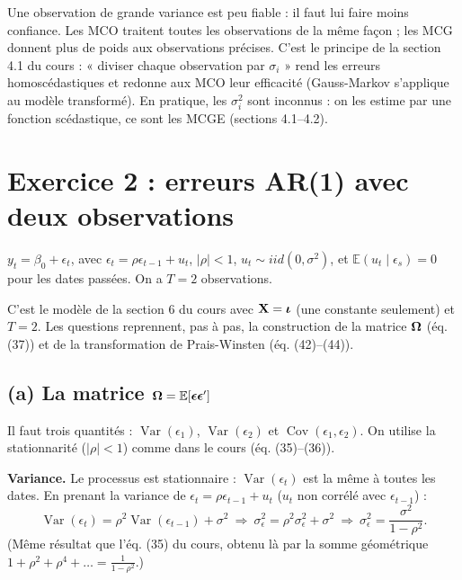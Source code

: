 \documentclass[11pt,a4paper]{article}
\newcommand{\veps}{\bm{\epsilon}}\newcommand{\vu}{\mathbf{u}}\newcommand{\vbeta}{\bm{\beta}}
\newcommand{\E}{\mathbb{E}}\newcommand{\Var}{\operatorname{Var}}\newcommand{\Cov}{\operatorname{Cov}}
\begin{document}
\begin{intuition}
Une observation de grande variance est peu fiable : il faut lui faire moins confiance. Les MCO traitent toutes les observations de la même façon ; les MCG donnent plus de poids aux observations précises. C'est le principe de la section 4.1 du cours : « diviser chaque observation par $\sigma_i$ » rend les erreurs homoscédastiques et redonne aux MCO leur efficacité (Gauss-Markov s'applique au modèle transformé). En pratique, les $\sigma_i^2$ sont inconnus : on les estime par une fonction scédastique, ce sont les MCGE (sections 4.1--4.2).
\end{intuition}

\section{Exercice 2 : erreurs AR(1) avec deux observations}

$y_t=\beta_0+\epsilon_t$, avec $\epsilon_t=\rho\epsilon_{t-1}+u_t$, $|\rho|<1$, $u_t\sim iid(0,\sigma^2)$, et $\E(u_t\mid\epsilon_s)=0$ pour les dates passées. On a $T=2$ observations.

\begin{cours}
C'est le modèle de la section 6 du cours avec $\mathbf{X}=\bm{\iota}$ (une constante seulement) et $T=2$. Les questions reprennent, pas à pas, la construction de la matrice $\bm{\Omega}$ (éq. (37)) et de la transformation de Prais-Winsten (éq. (42)--(44)).
\end{cours}

\subsection*{(a) La matrice $\Om=\E[\veps\veps']$}

\begin{idee}
Il faut trois quantités : $\Var(\epsilon_1)$, $\Var(\epsilon_2)$ et $\Cov(\epsilon_1,\epsilon_2)$. On utilise la stationnarité ($|\rho|<1$) comme dans le cours (éq. (35)--(36)).
\end{idee}

\textbf{Variance.} Le processus est stationnaire : $\Var(\epsilon_t)$ est la même à toutes les dates. En prenant la variance de $\epsilon_t=\rho\epsilon_{t-1}+u_t$ ($u_t$ non corrélé avec $\epsilon_{t-1}$) :
\[
\Var(\epsilon_t)=\rho^2\Var(\epsilon_{t-1})+\sigma^2
\ \Longrightarrow\ \sigma_\epsilon^2=\rho^2\sigma_\epsilon^2+\sigma^2
\ \Longrightarrow\ \sigma_\epsilon^2=\frac{\sigma^2}{1-\rho^2}.
\]
(Même résultat que l'éq. (35) du cours, obtenu là par la somme géométrique $1+\rho^2+\rho^4+\dots=\frac1{1-\rho^2}$.)
\end{document}

